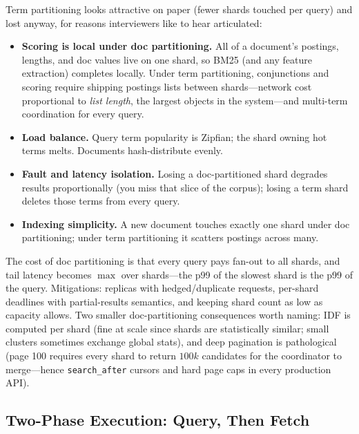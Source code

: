 Term partitioning looks attractive on paper (fewer shards touched per query) and lost anyway, for reasons interviewers like to hear articulated:

\begin{itemize}
    \item \textbf{Scoring is local under doc partitioning.} All of a document's postings, lengths, and doc values live on one shard, so BM25 (and any feature extraction) completes locally. Under term partitioning, conjunctions and scoring require shipping postings lists between shards---network cost proportional to \emph{list length}, the largest objects in the system---and multi-term coordination for every query.
    \item \textbf{Load balance.} Query term popularity is Zipfian; the shard owning hot terms melts. Documents hash-distribute evenly.
    \item \textbf{Fault and latency isolation.} Losing a doc-partitioned shard degrades results proportionally (you miss that slice of the corpus); losing a term shard deletes those terms from every query.
    \item \textbf{Indexing simplicity.} A new document touches exactly one shard under doc partitioning; under term partitioning it scatters postings across many.
\end{itemize}

The cost of doc partitioning is that every query pays fan-out to all shards, and tail latency becomes $\max$ over shards---the p99 of the slowest shard is the p99 of the query. Mitigations: replicas with hedged/duplicate requests, per-shard deadlines with partial-results semantics, and keeping shard count as low as capacity allows. Two smaller doc-partitioning consequences worth naming: IDF is computed per shard (fine at scale since shards are statistically similar; small clusters sometimes exchange global stats), and deep pagination is pathological (page 100 requires every shard to return $100k$ candidates for the coordinator to merge---hence \texttt{search\_after} cursors and hard page caps in every production API).

\subsection{Two-Phase Execution: Query, Then Fetch}

